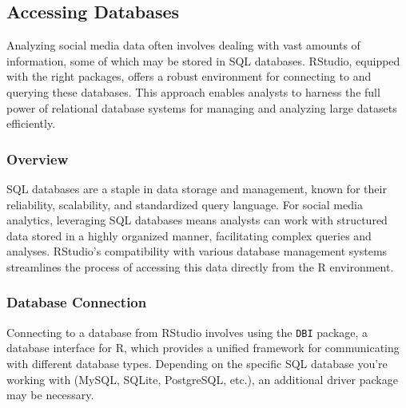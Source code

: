 \documentclass[
]{book}
\begin{document}
\hypertarget{accessing-databases}{%
\subsection{Accessing Databases}\label{accessing-databases}}

Analyzing social media data often involves dealing with vast amounts of information, some of which may be stored in SQL databases. RStudio, equipped with the right packages, offers a robust environment for connecting to and querying these databases. This approach enables analysts to harness the full power of relational database systems for managing and analyzing large datasets efficiently.

\hypertarget{overview-13}{%
\subsubsection{Overview}\label{overview-13}}

SQL databases are a staple in data storage and management, known for their reliability, scalability, and standardized query language. For social media analytics, leveraging SQL databases means analysts can work with structured data stored in a highly organized manner, facilitating complex queries and analyses. RStudio's compatibility with various database management systems streamlines the process of accessing this data directly from the R environment.

\hypertarget{database-connection}{%
\subsubsection{Database Connection}\label{database-connection}}

Connecting to a database from RStudio involves using the \texttt{DBI} package, a database interface for R, which provides a unified framework for communicating with different database types. Depending on the specific SQL database you're working with (MySQL, SQLite, PostgreSQL, etc.), an additional driver package may be necessary.
\end{document}
